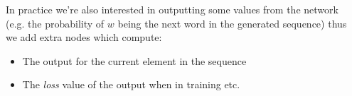 \documentclass{beamer}
\begin{document}
\begin{frame}
\begin{columns}
\begin{column}{0.3\textwidth}
\begin{center}
      \end{center}
    \end{column}
    \begin{column}{0.7\textwidth}
      In practice we're also interested in outputting some values from the network (e.g. the probability of \(w\) being the next word in the generated sequence) thus we add extra nodes which compute:
      \begin{itemize}
        \item The output for the current element in the sequence
        \item The \textit{loss} value of the output when in training etc.
      \end{itemize}
    \end{column}
  \end{columns}
\end{frame}
\end{document}
